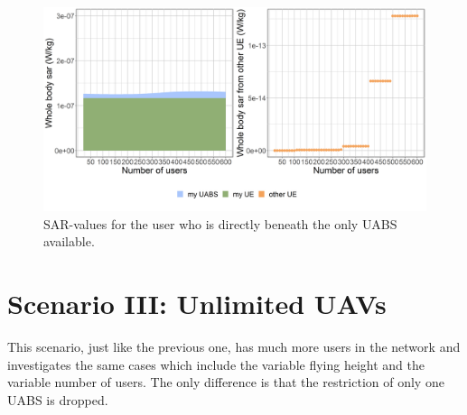 \begin{figure}[hb]
\centering
  \includegraphics[width=\textwidth]{../results/s2/uvsulsarcentralUser.png}
  \caption{SAR-values for the user who is directly beneath the only \acs{UABS} available.}
  \label{fig:uvsulsarcentralUsers}
\end{figure}

\FloatBarrier
\section{Scenario III: Unlimited \gls{UAV}s}
\label{s3}

This scenario, just like the previous one, has much more users in the network 
and investigates the same cases which include the variable flying height and the variable number of  users.
The only difference is that the restriction of only one \gls{UABS} is dropped.

